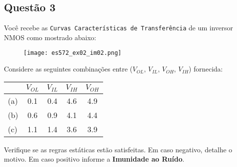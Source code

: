 \documentclass{article}
\begin{document}
\newpage
        \subsection{Questão 3}
            \begin{exercise}
                Você recebe as \texttt{Curvas Características de Transferência} de um inversor NMOS como mostrado abaixo:
                    \begin{figure}[H]
                        \centering
                        \texttt{[image: es572\_ex02\_im02.png]}
                    \end{figure} \noindent
                Considere as seguintes combinações entre ($V_{OL}$, $V_{IL}$, $V_{OH}$, $V_{IH}$) fornecida:
                    \begin{table}[H]
                        \centering  
                        \begin{tabular}[]{l cccc}\hline
                                & $V_{OL}$ & $V_{IL}$ & $V_{IH}$ & $V_{OH}$\\\hline
                            (a) & 0.1      & 0.4      & 4.6      & 4.9\\
                            (b) & 0.6      & 0.9      & 4.1      & 4.4\\
                            (c) & 1.1      & 1.4      & 3.6      & 3.9\\\hline
                        \end{tabular}
                    \end{table}
                Verifique se as regras estáticas estão satisfeitas. Em caso negativo, detalhe o motivo. Em caso positivo informe a \textbf{Imunidade ao Ruído}.
            \end{exercise}
\end{document}
